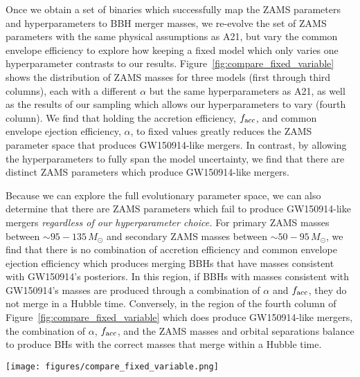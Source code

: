 \documentclass[linenumbers,twocolumn]{aastex631}
\begin{document}
Once we obtain a set of binaries which successfully map the ZAMS parameters and
hyperparameters to BBH merger masses, we re-evolve the set of ZAMS parameters
with the same physical assumptions as A21, but vary the common envelope
efficiency to explore how keeping a fixed model which only varies one
hyperparameter contrasts to our results. Figure~\ref{fig:compare_fixed_variable}
shows the distribution of ZAMS masses for three models (first through third
columns), each with a different $\alpha$ but the same hyperparameters as A21, as
well as the results of our sampling which allows our hyperparameters to vary
(fourth column). We find that holding the accretion efficiency, $f_{\rm{acc}}$,
and common envelope ejection efficiency, $\alpha$, to fixed values greatly
reduces the ZAMS parameter space that produces GW150914-like mergers. In
contrast, by allowing the hyperparameters to fully span the model uncertainty,
we find that there are distinct ZAMS parameters which produce GW150914-like
mergers.

Because we can explore the full evolutionary parameter space, we can also
determine that there are ZAMS parameters which fail to produce GW150914-like
mergers \emph{regardless of our hyperparameter choice.} For primary ZAMS masses
between $\sim95-135\,M_{\odot}$ and secondary ZAMS masses between
$\sim50-95\,M_{\odot}$, we find that there is no combination of accretion
efficiency and common envelope ejection efficiency which produces merging BBHs
that have masses consistent with GW150914's posteriors. In this region, if BBHs
with masses consistent with GW150914's masses are produced through a combination
of $\alpha$ and $f_{\rm{acc}}$, they do not merge in a Hubble time. Conversely,
in the region of the fourth column of Figure~\ref{fig:compare_fixed_variable}
which does produce GW150914-like mergers, the combination of $\alpha$,
$f_{\rm{acc}}$, and the ZAMS masses and orbital separations balance to produce
BHs with the correct masses that merge within a Hubble time.


\begin{figure*}
    \texttt{[image: figures/compare\_fixed\_variable.png]}
    \caption{Comparison of ZAMS masses for binaries which produce GW150914-like
     mergers for three variations of $\alpha$ with a fixed set of parameter
     assumptions matching those of A21 (first three columns) and for binaries
     which produce GW150914-like mergers when $\alpha$, $f_{\mathrm{acc}}$, and
     $q_{crit,3}$ are allowed to vary, (fourth column).}
    \label{fig:compare_fixed_variable}
\end{figure*}
\end{document}
